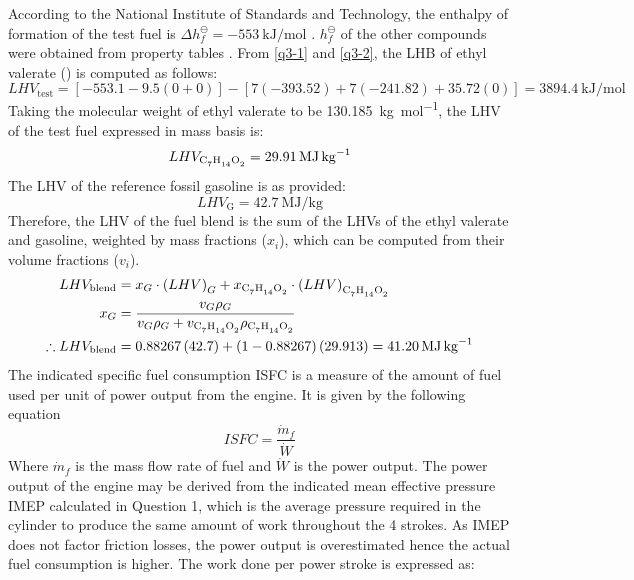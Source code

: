 \documentclass[11pt]{article}
\begin{document}
According to the National Institute of Standards and Technology, the enthalpy of formation of the test fuel is $\Delta h_f^{\ominus} = \SI{-553}{\kilo\joule\per\mol}$ \cite{q3-r3}. $h_f^{\ominus}$ of the other compounds were obtained from property tables \cite{q4-r4}. From \eqref{q3-1} and \eqref{q3-2}, the LHB of ethyl valerate () is computed as follows:
\begin{equation}
    LHV_{\textrm{test}} = \left[-553.1-9.5\left(0+0\right)\right]-\left[7\left(-393.52\right)+7\left(-241.82\right)+35.72\left(0\right)\right] = \SI{3894.4}{\kilo\joule\per\mol}
\end{equation}
Taking the molecular weight of ethyl valerate to be \SI{130.185}{\kilo\gram\per\mole}, the LHV of the test fuel expressed in mass basis is: 
\begin{equation}
    LHV_{\ce{C7H14O2}} = \SI{29.91}{\mega\joule\per\kg}
\end{equation}
The LHV of the reference fossil gasoline is as provided: 
\begin{equation}
    LHV_{\textrm{G}} = \SI{42.7}{\mega\joule\per\kg}
\end{equation}
Therefore, the LHV of the fuel blend is the sum of the LHVs of the ethyl valerate and gasoline, weighted by mass fractions ($x_i$), which can be computed from their volume fractions ($v_i$). \cite{q3-r1}
\begin{align}
    LHV_{\textrm{blend}} &= x_G \cdot \left(LHV\right)_G + x_{\ce{C7H14O2}} \cdot \left(LHV\right)_{\ce{C7H14O2}}\\
    x_G &= \frac{v_G \rho_G}{v_G \rho_G + v_{\ce{C7H14O2}}\rho_{\ce{C7H14O2}}}\\
    \therefore LHV_{\textrm{blend}} &= 0.88267\left(42.7\right) + \left(1-0.88267\right)\left(29.913\right) = \SI{41.20}{\mega\joule\per\kg}
\end{align}
The indicated specific fuel consumption ISFC is a measure of the amount of fuel used per unit of power output from the engine. It is given by the following equation \cite{q3-r5}
\begin{equation}
    ISFC = \frac{\dot{m}_f}{\dot{W}} \label{q3-3}
\end{equation}
Where $\dot{m}_f$ is the mass flow rate of fuel and $\dot{W}$ is the power output. The power output of the engine may be derived from the indicated mean effective pressure IMEP calculated in Question 1, which is the average pressure required in the cylinder to produce the same amount of work throughout the 4 strokes. As IMEP does not factor friction losses, the power output is overestimated hence the actual fuel consumption is higher. The work done per power stroke is expressed as: 
\end{document}
